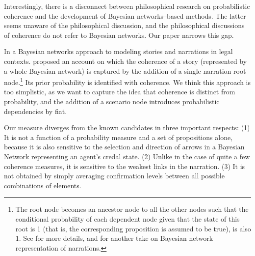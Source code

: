 \documentclass[10pt,]{scrartcl}
\begin{document}
Interestingly, there is a disconnect between philosophical research on probabilistic coherence and the development of  Bayesian networks--based methods. The latter seems  unaware of the philosophical discussion, and the philosophical discussions of coherence do not refer to  Bayesian networks. Our paper  narrows this gap.



In a  Bayesian networks approach to  modeling stories and narrations in legal contexts.
\citet{vlek2013modeling} proposed an account  on which the coherence of a story (represented by a whole Bayesian network)
is captured by the addition of a single narration root node.\footnote{The root node  becomes an ancestor
node to all the other nodes such that the conditional probability of
each dependent node given that the state of this root is 1 (that is, the
corresponding proposition is assumed to be true), is also 1. See \citep{vlek2014building,vlek2015,vlek2016method,vlek2016stories} for more details, and \citep{fenton2013general} for another take on Bayesian network representation of narrations.}  Its prior probability is identified with coherence. We think this approach is too simplistic, as we want to capture the idea that coherence is distinct
from probability, and  the addition of a scenario node  introduces probabilistic
dependencies by fiat. 















Our measure diverges from the known candidates in three important
respects: (1) It is not a function of a probability measure and a set
of propositions alone, because it is also sensitive to the selection and
direction of arrows in a Bayesian Network representing an agent's credal state. (2) Unlike in the case of quite a few coherence measures, it is  sensitive to
 the  weakest links in the narration.
(3) It is not obtained by simply averaging confirmation levels between all possible combinations of elements.
\end{document}
